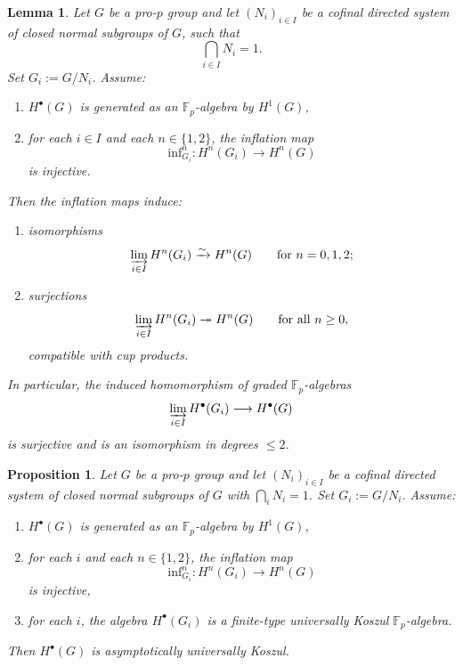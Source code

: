 \documentclass[10pt,a4paper]{amsart}
\newtheorem{proposition}{Proposition}
\newtheorem{lemma}{Lemma}
\begin{document}
	\begin{lemma}\label{lem:cohom-colimit}
		Let \(G\) be a pro-\(p\) group and let \((N_i)_{i\in I}\) be a cofinal directed system of closed normal subgroups of \(G\), such that
		\[\bigcap_{i\in I} N_i = 1.\]
		Set \(G_i:=G/N_i\). Assume:
		\begin{enumerate}[label=(\roman*)]
			\item \(H^\bullet(G)\) is generated as an \(\mathbb{F}_p\)-algebra by \(H^1(G)\),
			\item for each \(i\in I\) and each \(n\in\{1,2\}\), the inflation map 
			\[\mathrm{inf}^n_{G_i}\colon H^n(G_i)\longrightarrow H^n(G)\]
			is injective.
		\end{enumerate}
		Then the inflation maps induce:
		\begin{enumerate}[label=(\alph*)]
			\item isomorphisms
			\[\varinjlim_{i\in I} H^n(G_i)\xrightarrow{\sim} H^n(G) \qquad \text{for } n=0,1,2;\]
			\item surjections
			\[ \varinjlim_{i\in I} H^n(G_i)\twoheadrightarrow H^n(G) \qquad \text{for all } n\ge 0,\]
			compatible with cup products.
		\end{enumerate}
		In particular, the induced homomorphism of graded \(\mathbb{F}_p\)-algebras
		\[\varinjlim_{i\in I} H^\bullet(G_i)\longrightarrow H^\bullet(G)\]
		is surjective and is an isomorphism in degrees \(\le 2\).
	\end{lemma}

	\begin{proposition}\label{prop:galois}
		Let \(G\) be a pro-\(p\) group and let \((N_i)_{i\in I}\) be a cofinal directed system of closed normal subgroups of \(G\) with \(\bigcap_i N_i=1\). Set \(G_i:=G/N_i\). Assume:
		\begin{enumerate}[label=(\roman*)]
			\item \(H^\bullet(G)\) is generated as an \(\mathbb{F}_p\)-algebra by \(H^1(G)\),
			\item for each \(i\) and each \(n\in\{1,2\}\), the inflation map
			\[\mathrm{inf}^n_{G_i}\colon H^n(G_i)\longrightarrow H^n(G)\]
			is injective,
			\item for each \(i\), the algebra \(H^\bullet(G_i)\) is a finite-type universally Koszul \(\mathbb{F}_p\)-algebra.
		\end{enumerate}
		Then \(H^\bullet(G)\) is asymptotically universally Koszul.
	\end{proposition}
\end{document}
